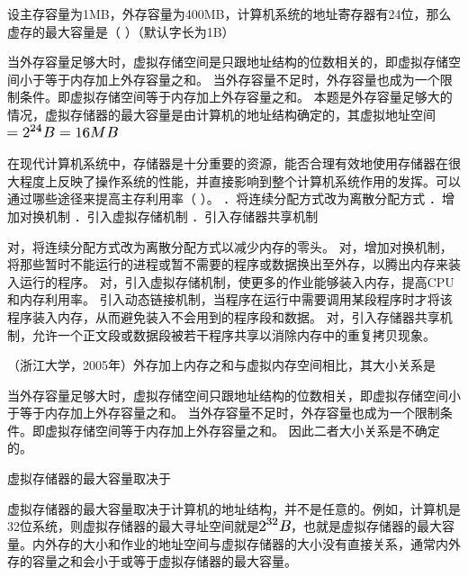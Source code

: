 \question 设主存容量为1MB，外存容量为400MB，计算机系统的地址寄存器有24位，那么虚存的最大容量是（
）（默认字长为1B）
\par{}
\begin{solution}当外存容量足够大时，虚拟存储空间是只跟地址结构的位数相关的，即虚拟存储空间小于等于内存加上外存容量之和。
当外存容量不足时，外存容量也成为一个限制条件。即虚拟存储空间等于内存加上外存容量之和。
本题是外存容量足够大的情况，虚拟存储器的最大容量是由计算机的地址结构确定的，其虚拟地址空间\includegraphics[width=1.28125in,height=0.16667in]{texmath/3bdb835Cdpi7B3507D3D25E7B247DB3D16MB}
\end{solution}
\question 在现代计算机系统中，存储器是十分重要的资源，能否合理有效地使用存储器在很大程度上反映了操作系统的性能，并直接影响到整个计算机系统作用的发挥。可以通过哪些途径来提高主存利用率（
）。 ．将连续分配方式改为离散分配方式 ．增加对换机制
．引入虚拟存储机制 ．引入存储器共享机制
\par{}
\begin{solution}对，将连续分配方式改为离散分配方式以减少内存的零头。
对，增加对换机制，将那些暂时不能运行的进程或暂不需要的程序或数据换出至外存，以腾出内存来装入运行的程序。
对，引入虚拟存储机制，使更多的作业能够装入内存，提高CPU和内存利用率。
引入动态链接机制，当程序在运行中需要调用某段程序时才将该程序装入内存，从而避免装入不会用到的程序段和数据。
对，引入存储器共享机制，允许一个正文段或数据段被若干程序共享以消除内存中的重复拷贝现象。
\end{solution}
\question （浙江大学，2005年）外存加上内存之和与虚拟内存空间相比，其大小关系是
\par{}
\begin{solution}当外存容量足够大时，虚拟存储空间只跟地址结构的位数相关，即虚拟存储空间小于等于内存加上外存容量之和。
当外存容量不足时，外存容量也成为一个限制条件。即虚拟存储空间等于内存加上外存容量之和。
因此二者大小关系是不确定的。
\end{solution}
\question 虚拟存储器的最大容量取决于
\par{}
\begin{solution}虚拟存储器的最大容量取决于计算机的地址结构，并不是任意的。例如，计算机是32位系统，则虚拟存储器的最大寻址空间就是\includegraphics[width=0.36458in,height=0.15625in]{texmath/af718c5Cdpi7B3507D25E7B327DB}，也就是虚拟存储器的最大容量。内外存的大小和作业的地址空间与虚拟存储器的大小没有直接关系，通常内外存的容量之和会小于或等于虚拟存储器的最大容量。
\end{solution}
